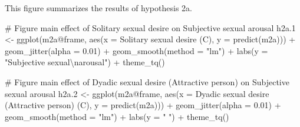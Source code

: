 \documentclass[
  bookmarksnumbered]{article}
\newenvironment{Shaded}{\begin{snugshade}}{\end{snugshade}}
\newcommand{\AttributeTok}[1]{\textcolor[rgb]{0.80,0.80,0.80}{#1}}
\newcommand{\CommentTok}[1]{\textcolor[rgb]{0.50,0.62,0.50}{#1}}
\newcommand{\FloatTok}[1]{\textcolor[rgb]{0.75,0.75,0.82}{#1}}
\newcommand{\FunctionTok}[1]{\textcolor[rgb]{0.94,0.94,0.56}{#1}}
\newcommand{\NormalTok}[1]{\textcolor[rgb]{0.80,0.80,0.80}{#1}}
\newcommand{\OtherTok}[1]{\textcolor[rgb]{0.94,0.94,0.56}{#1}}
\newcommand{\SpecialCharTok}[1]{\textcolor[rgb]{0.86,0.64,0.64}{#1}}
\newcommand{\StringTok}[1]{\textcolor[rgb]{0.80,0.58,0.58}{#1}}
\begin{document}
This figure summarizes the results of hypothesis 2a.

\begin{Shaded}
\begin{Highlighting}[]
\CommentTok{\# Figure main effect of Solitary sexual desire on Subjective sexual arousal}
\NormalTok{h2a}\FloatTok{.1} \OtherTok{\textless{}{-}} \FunctionTok{ggplot}\NormalTok{(m2a}\SpecialCharTok{@}\NormalTok{frame, }\FunctionTok{aes}\NormalTok{(}\AttributeTok{x =} \StringTok{\textasciigrave{}}\AttributeTok{Solitary sexual desire (C)}\StringTok{\textasciigrave{}}\NormalTok{, }\AttributeTok{y =} \FunctionTok{predict}\NormalTok{(m2a))) }\SpecialCharTok{+}
  \FunctionTok{geom\_jitter}\NormalTok{(}\AttributeTok{alpha =}  \FloatTok{0.01}\NormalTok{) }\SpecialCharTok{+}
  \FunctionTok{geom\_smooth}\NormalTok{(}\AttributeTok{method =} \StringTok{"lm"}\NormalTok{) }\SpecialCharTok{+}
  \FunctionTok{labs}\NormalTok{(}\AttributeTok{y =} \StringTok{"Subjective sexual}\SpecialCharTok{\textbackslash{}n}\StringTok{arousal"}\NormalTok{) }\SpecialCharTok{+}
  \FunctionTok{theme\_tq}\NormalTok{()}

\CommentTok{\# Figure main effect of Dyadic sexual desire (Attractive person) on Subjective sexual arousal}
\NormalTok{h2a}\FloatTok{.2} \OtherTok{\textless{}{-}} \FunctionTok{ggplot}\NormalTok{(m2a}\SpecialCharTok{@}\NormalTok{frame, }\FunctionTok{aes}\NormalTok{(}\AttributeTok{x =} \StringTok{\textasciigrave{}}\AttributeTok{Dyadic sexual desire (Attractive person) (C)}\StringTok{\textasciigrave{}}\NormalTok{, }
                               \AttributeTok{y =} \FunctionTok{predict}\NormalTok{(m2a))) }\SpecialCharTok{+}
  \FunctionTok{geom\_jitter}\NormalTok{(}\AttributeTok{alpha =}  \FloatTok{0.01}\NormalTok{) }\SpecialCharTok{+}
  \FunctionTok{geom\_smooth}\NormalTok{(}\AttributeTok{method =} \StringTok{"lm"}\NormalTok{) }\SpecialCharTok{+}
  \FunctionTok{labs}\NormalTok{(}\AttributeTok{y =} \StringTok{" "}\NormalTok{) }\SpecialCharTok{+}
  \FunctionTok{theme\_tq}\NormalTok{()}


\end{Highlighting}
\end{Shaded}
\end{document}
